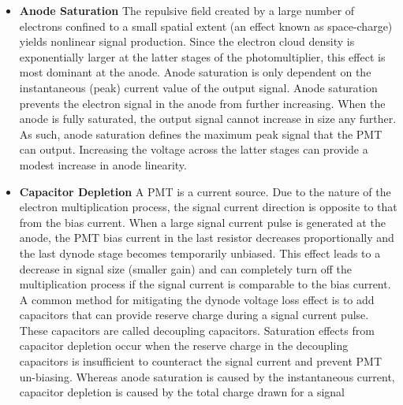 \begin{itemize}
\item \textbf{Anode Saturation} The repulsive field created by a large number of electrons confined to a small spatial extent (an effect known as space-charge) yields nonlinear signal production. Since the electron cloud density is exponentially larger at the latter stages of the photomultiplier, this effect is most dominant at the anode. Anode saturation is only dependent on the instantaneous (peak) current value of the output signal. Anode saturation prevents the electron signal in the anode from further increasing. When the anode is fully saturated, the output signal cannot increase in size any further. As such, anode saturation defines the maximum peak signal that the \ac{PMT} can output. Increasing the voltage across the latter stages can provide a modest increase in anode linearity.

\item \textbf{Capacitor Depletion}  A \ac{PMT} is a current source. Due to the nature of the electron multiplication process, the signal current direction is opposite to that from the bias current. When a large signal current pulse is generated at the anode, the \ac{PMT} bias current in the last resistor decreases proportionally and the last dynode stage becomes temporarily unbiased. This effect leads to a decrease in signal size (smaller gain) and can completely turn off the multiplication process if the signal current is comparable to the bias current. A common method for mitigating the dynode voltage loss effect is to add capacitors that can provide reserve charge during a signal current pulse. These capacitors are called decoupling capacitors. Saturation effects from capacitor depletion occur when the reserve charge in the decoupling capacitors is insufficient to counteract the signal current and prevent \ac{PMT} un-biasing. Whereas anode saturation is caused by the instantaneous current, capacitor depletion is caused by the total charge drawn for a signal
 \end{itemize}

